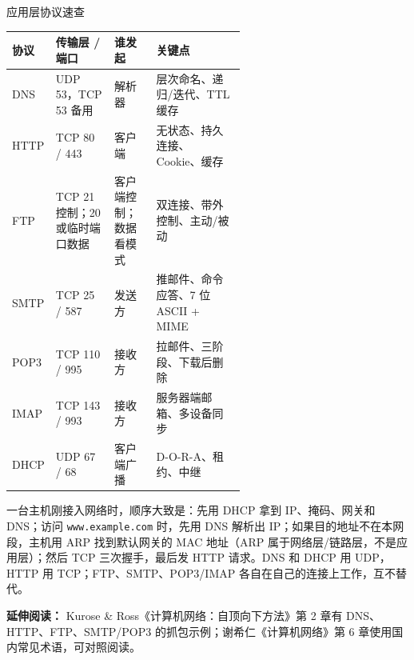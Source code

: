 \begin{tablebox}{应用层协议速查}
\centering
\small
\begin{tabularx}{\linewidth}{|p{0.15\linewidth}|p{0.25\linewidth}|p{0.18\linewidth}|X|}
\hline
\textbf{协议} & \textbf{传输层 / 端口} & \textbf{谁发起} & \textbf{关键点} \\
\hline
DNS & UDP 53，TCP 53 备用 & 解析器 & 层次命名、递归/迭代、TTL 缓存 \\
HTTP & TCP 80 / 443 & 客户端 & 无状态、持久连接、Cookie、缓存 \\
FTP & TCP 21 控制；20 或临时端口数据 & 客户端控制；数据看模式 & 双连接、带外控制、主动/被动 \\
SMTP & TCP 25 / 587 & 发送方 & 推邮件、命令应答、7 位 ASCII + MIME \\
POP3 & TCP 110 / 995 & 接收方 & 拉邮件、三阶段、下载后删除 \\
IMAP & TCP 143 / 993 & 接收方 & 服务器端邮箱、多设备同步 \\
DHCP & UDP 67 / 68 & 客户端广播 & D-O-R-A、租约、中继 \\
\hline
\end{tabularx}
\end{tablebox}

一台主机刚接入网络时，顺序大致是：先用 DHCP 拿到 IP、掩码、网关和 DNS；访问 \texttt{www.example.com} 时，先用 DNS 解析出 IP；如果目的地址不在本网段，主机用 ARP 找到默认网关的 MAC 地址（ARP 属于网络层/链路层，不是应用层）；然后 TCP 三次握手，最后发 HTTP 请求。DNS 和 DHCP 用 UDP，HTTP 用 TCP；FTP、SMTP、POP3/IMAP 各自在自己的连接上工作，互不替代。

\noindent\textbf{延伸阅读：} Kurose \& Ross《计算机网络：自顶向下方法》第 2 章有 DNS、HTTP、FTP、SMTP/POP3 的抓包示例；谢希仁《计算机网络》第 6 章使用国内常见术语，可对照阅读。

\newpage

